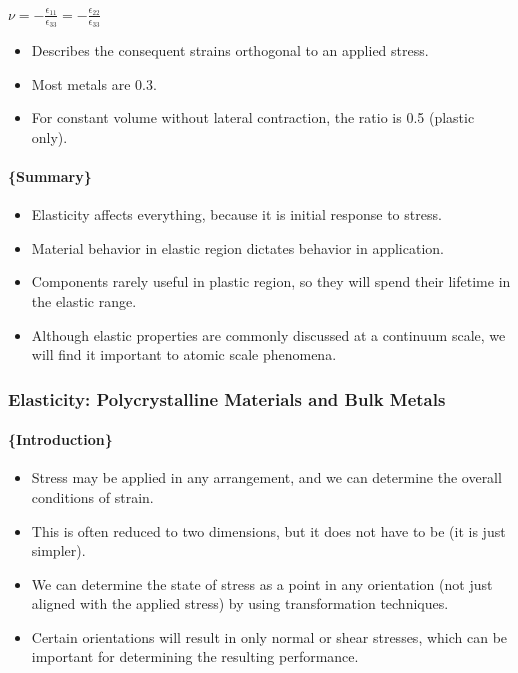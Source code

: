 \documentclass[
]{article}
\providecommand{\tightlist}{%
  \setlength{\itemsep}{0pt}\setlength{\parskip}{0pt}}
\begin{document}
\(\nu = -\frac{\epsilon_{11}}{\epsilon_{33}} = -\frac{\epsilon_{22}}{\epsilon_{33}}\)

{}

\begin{itemize}
\tightlist
\item
  Describes the consequent strains orthogonal to an applied stress.
\item
  Most metals are 0.3.
\item
  For constant volume without lateral contraction, the ratio is 0.5
  (plastic only).
\end{itemize}

\hypertarget{summary-1}{%
\paragraph{\{Summary\}}\label{summary-1}}

\begin{itemize}
\tightlist
\item
  Elasticity affects everything, because it is initial response to
  stress.
\item
  Material behavior in elastic region dictates behavior in application.
\item
  Components rarely useful in plastic region, so they will spend their
  lifetime in the elastic range.
\item
  Although elastic properties are commonly discussed at a continuum
  scale, we will find it important to atomic scale phenomena.
\end{itemize}

\hypertarget{elasticity-polycrystalline-materials-and-bulk-metals}{%
\subsubsection{Elasticity: Polycrystalline Materials and Bulk
Metals}\label{elasticity-polycrystalline-materials-and-bulk-metals}}

\hypertarget{introduction-2}{%
\paragraph{\{Introduction\}}\label{introduction-2}}

\begin{itemize}
\tightlist
\item
  Stress may be applied in any arrangement, and we can determine the
  overall conditions of strain.
\item
  This is often reduced to two dimensions, but it does not have to be
  (it is just simpler).
\item
  We can determine the state of stress as a point in any orientation
  (not just aligned with the applied stress) by using transformation
  techniques.
\item
  Certain orientations will result in only normal or shear stresses,
  which can be important for determining the resulting performance.
\end{itemize}
\end{document}
